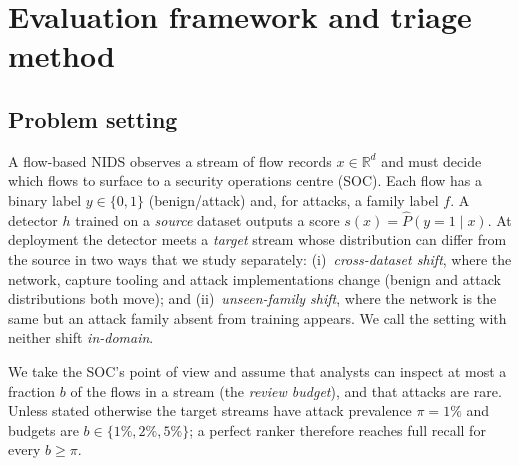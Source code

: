 \section{Evaluation framework and triage method}\label{sec:method}

\subsection{Problem setting}
A flow-based NIDS observes a stream of flow records $x\in\mathbb{R}^d$ and must decide which flows to surface to a security operations centre (SOC). Each flow has a binary label $y\in\{0,1\}$ (benign/attack) and, for attacks, a family label $f$. A detector $h$ trained on a \emph{source} dataset outputs a score $s(x)=\hat{P}(y=1\mid x)$. At deployment the detector meets a \emph{target} stream whose distribution can differ from the source in two ways that we study separately: (i)~\emph{cross-dataset shift}, where the network, capture tooling and attack implementations change (benign and attack distributions both move); and (ii)~\emph{unseen-family shift}, where the network is the same but an attack family absent from training appears. We call the setting with neither shift \emph{in-domain}.

We take the SOC's point of view and assume that analysts can inspect at most a fraction $b$ of the flows in a stream (the \emph{review budget}), and that attacks are rare. Unless stated otherwise the target streams have attack prevalence $\pi=1\%$ and budgets are $b\in\{1\%,2\%,5\%\}$; a perfect ranker therefore reaches full recall for every $b\ge\pi$.

